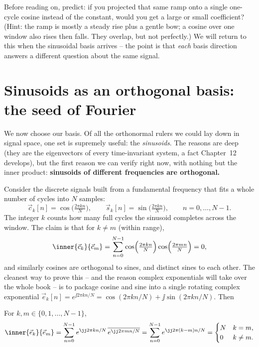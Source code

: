 \begin{walkbox}
Before reading on, predict: if you projected that same ramp onto a single one-cycle cosine instead of
the constant, would you get a large or small coefficient? (Hint: the ramp is mostly a steady rise
plus a gentle bow; a cosine over one window also rises then falls. They overlap, but not perfectly.)
We will return to this when the sinusoidal basis arrives -- the point is that \emph{each} basis
direction answers a different question about the same signal.
\end{walkbox}

\section{Sinusoids as an orthogonal basis: the seed of Fourier}
\label{ch03:sinusoid-basis}

We now choose our basis. Of all the orthonormal rulers we could lay down in signal space, one set is
supremely useful: the \emph{sinusoids}. The reasons are deep (they are the eigenvectors of every
time-invariant system, a fact Chapter~12 develops), but the first reason we can verify right now,
with nothing but the inner product: \textbf{sinusoids of different frequencies are orthogonal.}

Consider the discrete signals built from a fundamental frequency that fits a whole number of cycles
into $N$ samples:
\[
  \vec{c}_k[n] = \cos\!\Big(\tfrac{2\pi k n}{N}\Big), \qquad
  \vec{s}_k[n] = \sin\!\Big(\tfrac{2\pi k n}{N}\Big), \qquad n=0,\dots,N-1 .
\]
The integer $k$ counts how many full cycles the sinusoid completes across the window. The claim is
that for $k\neq m$ (within range),
\[
  \inner{\vec{c}_k}{\vec{c}_m} = \sum_{n=0}^{N-1}
  \cos\!\Big(\tfrac{2\pi k n}{N}\Big)\cos\!\Big(\tfrac{2\pi m n}{N}\Big) = 0 ,
\]
and similarly cosines are orthogonal to sines, and distinct sines to each other. The cleanest way to
prove this -- and the reason complex exponentials will take over the whole book -- is to package
cosine and sine into a single rotating complex exponential
$\vec{e}_k[n]=e^{\jj 2\pi k n/N} = \cos(2\pi kn/N) + \jj\sin(2\pi kn/N)$. Then

\begin{theorem}
\label{ch03:thm-dft-ortho}
For $k,m \in \{0,1,\dots,N-1\}$,
\[
  \inner{\vec{e}_k}{\vec{e}_m}
  = \sum_{n=0}^{N-1} e^{\jj 2\pi k n/N}\, \overline{e^{\jj 2\pi m n/N}}
  = \sum_{n=0}^{N-1} e^{\jj 2\pi (k-m) n/N}
  = \begin{cases} N & k=m,\\ 0 & k\neq m. \end{cases}
\]
\end{theorem}

